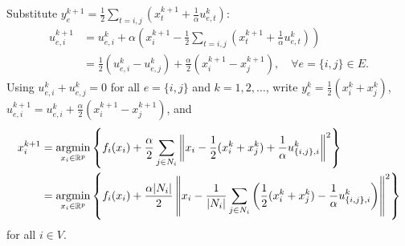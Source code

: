 \documentclass[10pt,mathserif]{beamer}
\begin{document}
\begin{frame}[fragile]
Substitute $y_e^{k+1}=\frac{1}{2}\sum_{t=i,j}(x_t^{k+1}+\frac{1}{\alpha}u_{e,t}^k)$:
\begin{align*}
    u_{e,i}^{k+1} & = u_{e,i}^k + \alpha\left(x_i^{k+1}-\frac{1}{2}\sum_{t=i,j}\left(x_t^{k+1}+\frac{1}{\alpha}u_{e,t}^k\right)\right)\\
    & = \frac{1}{2}(u_{e,i}^k-u_{e,j}^k) + \frac{\alpha}{2}(x_i^{k+1} - x_j^{k+1}), \quad \forall e=\{i,j\}\in E.
\end{align*}
Using $u_{e,i}^k+u_{e,j}^k=0$ for all $e=\{i,j\}$ and $k=1,2,\dots$,
write $y_e^{k}=\frac{1}{2}(x_i^k+x_j^k)$, $u_{e,i}^{k+1} = u_{e,i}^k + \frac{\alpha}{2}(x_i^{k+1}-x_j^{k+1})$, and
\begingroup\makeatletter\def\f@size{9}\check@mathfonts
\begin{align*}
    x_i^{k+1} & = \operatorname*{argmin}_{x_i\in \mathbb{R}^p} \left\{f_i(x_i) + \frac{\alpha}{2}\sum_{j\in N_i}\left\|x_i - \frac{1}{2}(x_i^k+x_j^k) +\frac{1}{\alpha}u_{\{i,j\},i}^k\right\|^2\right\} \\
    & = \operatorname*{argmin}_{x_i\in \mathbb{R}^p}\left\{ f_i(x_i) + \frac{\alpha|N_i|}{2}\left\|x_i - \frac{1}{|N_i|}\sum_{j\in N_i}\left(\frac{1}{2}(x_i^k+x_j^k) -\frac{1}{\alpha}u_{\{i,j\},i}^k\right)\right\|^2\right\}
\end{align*}
\endgroup
for all $i\in V$.
\end{frame}
\end{document}

